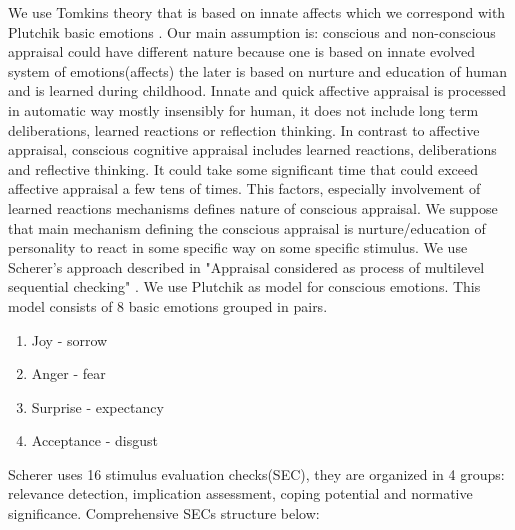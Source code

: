We use Tomkins theory that is based on innate affects which we correspond with Plutchik basic emotions \cite{natureofemotions}. Our main assumption is: conscious and non-conscious appraisal could have different nature because one is based on innate evolved system of emotions(affects) the later is based on nurture and education of human and is learned during childhood. Innate and quick affective appraisal is processed in automatic way mostly insensibly for human, it does not include long term deliberations, learned reactions or reflection thinking. In contrast to affective appraisal, conscious cognitive appraisal includes learned reactions, deliberations and reflective thinking. It could take some significant time that could exceed affective appraisal a few tens of times. This factors, especially involvement of learned reactions mechanisms defines nature of conscious appraisal. We suppose that main mechanism defining the conscious appraisal is nurture/education of personality to react in some specific way on some specific stimulus. We use Scherer's approach described in "Appraisal considered as process of multilevel sequential checking" \cite{appraisal_considered_as_a_process}. We use Plutchik \cite{natureofemotions} as model for conscious emotions. This model consists of 8 basic emotions grouped in pairs.

\begin{enumerate}
	\item  Joy - sorrow
	\item  Anger - fear
	\item  Surprise - expectancy
	\item  Acceptance - disgust
\end{enumerate}

Scherer uses 16 stimulus evaluation checks(SEC), they are organized in 4 groups: relevance detection, implication assessment, coping potential and normative significance.
Comprehensive SECs structure below:

